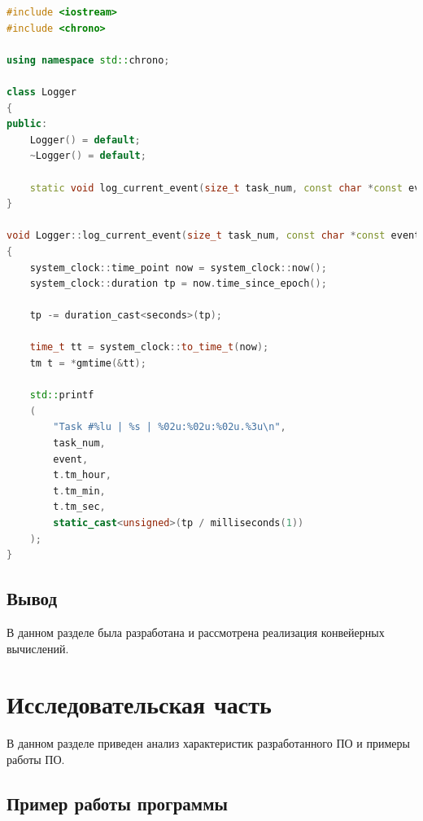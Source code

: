 \documentclass[12pt]{report}
\begin{document}
\begin{lstlisting}[label=some-code,caption=Реализация класса логирования, language=C++]
#include <iostream>
#include <chrono>

using namespace std::chrono;

class Logger 
{
public:
	Logger() = default;
	~Logger() = default;
	
	static void log_current_event(size_t task_num, const char *const event);
}

void Logger::log_current_event(size_t task_num, const char *const event) 
{
	system_clock::time_point now = system_clock::now();
	system_clock::duration tp = now.time_since_epoch();
	
	tp -= duration_cast<seconds>(tp);
	
	time_t tt = system_clock::to_time_t(now);
	tm t = *gmtime(&tt);
	
	std::printf
	(
		"Task #%lu | %s | %02u:%02u:%02u.%3u\n", 
		task_num,
		event, 
		t.tm_hour, 
		t.tm_min, 
		t.tm_sec, 
		static_cast<unsigned>(tp / milliseconds(1))
	);
}
\end{lstlisting}


\section{Вывод}

В данном разделе была разработана и рассмотрена реализация конвейерных вычислений.

\chapter{Исследовательская часть}

В данном разделе приведен анализ характеристик разработанного ПО  и примеры работы ПО.

\section{Пример работы программы}
\end{document}
